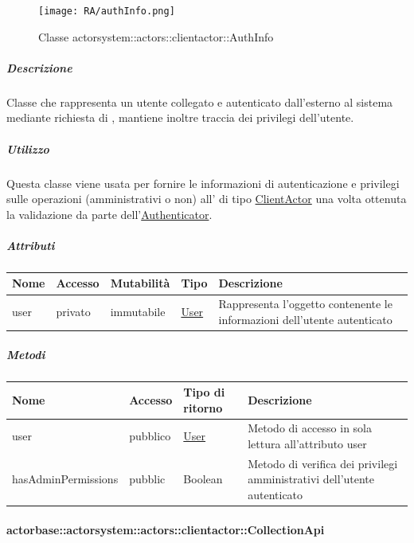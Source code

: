\documentclass{scalatekids-article}
\begin{document}
\begin{figure}[H]
  \begin{center}
    \texttt{[image: RA/authInfo.png]}
    \caption{Classe actorsystem::actors::clientactor::AuthInfo}
  \end{center}
\end{figure}

\subparagraph{Descrizione}

Classe che rappresenta un utente collegato e autenticato dall'esterno al sistema
mediante richiesta di , mantiene inoltre traccia dei privilegi
dell'utente.

\subparagraph{Utilizzo}

Questa classe viene usata per fornire le informazioni di autenticazione e
privilegi sulle operazioni (amministrativi o non) all' di tipo
\hyperref[sec:actorbase::actorsystem::actors::clientactor::ClientActor]{ClientActor}
una volta ottenuta la validazione da parte
dell'\hyperref[sec:actorbase::actorsystem::actors::clientactor::Authenticator]{Authenticator}.

\subparagraph{Attributi}
\begin{tabular}{| p{1.5cm} | p{1.5cm} | p{2cm} | p{3cm} | p{8.5cm} |}
  \hline
  Nome & Accesso & Mutabilità & Tipo & Descrizione\\
  \hline
  user & privato & immutabile & \hyperref[sec:actorbase::actorsystem::actors::clientactor::User]{User} & Rappresenta l'oggetto contenente le informazioni dell'utente autenticato\\
  \hline
\end{tabular}

\subparagraph{Metodi}

\begin{tabular}{| p{1.5cm} | p{1.5cm} | p{2.5cm} | p{9.5cm} |}
  \hline
  Nome & Accesso & Tipo di ritorno & Descrizione\\
  \hline
  user & pubblico & \hyperref[sec:actorbase::actorsystem::actors::clientactor::User]{User} & Metodo di accesso in sola lettura all'attributo user\\
  \hline
  hasAdminPermissions & pubblic & Boolean & Metodo di verifica dei privilegi amministrativi dell'utente autenticato\\
  \hline
\end{tabular}

\paragraph{actorbase::actorsystem::actors::clientactor::CollectionApi}
\label{sec:actorbase::actorsystem::actors::clientactor::CollectionApi}
\end{document}
